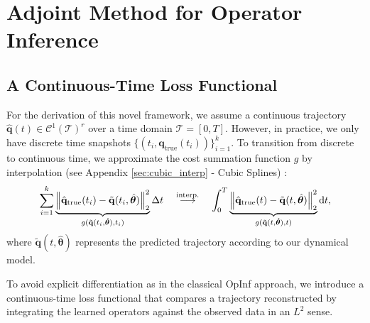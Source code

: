 \chapter{Adjoint Method for Operator Inference}
\label{chap:methodology}



\section{A Continuous-Time Loss Functional}

For the derivation of this novel framework, we assume a continuous trajectory $\hat{\mathbf{q}}(t) \in \mathcal{C}^1(\mathcal{T})^r$ over a time domain $\mathcal{T} = [0,T] $. However, in practice, we only have discrete time snapshots $\displaystyle\{ (t_i, \mathbf{q}_{\text{true}}(t_i)) \}_{i=1}^k$. To transition from discrete to continuous time, we approximate the cost summation function $g$ by interpolation (see Appendix \ref{sec:cubic_interp} - Cubic Splines) \cite{de1978practical}:\\
$$\sum_{i=1}^k \underbrace{\norm{\hat{\mathbf{q}}_\text{true}(t_i)-\tilde{\mathbf{q}}(t_i,\hat{\bm\theta})}_2^2}_{g(\tilde{\mathbf{q}}(t_i,\hat{\bm\theta}),t_i)}\Delta t 
\quad \overset{\text{interp.}}{\longrightarrow} \quad  
\int_0^T \underbrace{\norm{\hat{\mathbf{q}}_\text{true}(t)-\tilde{\mathbf{q}}(t,\hat{\bm\theta})}_2^2}_{g(\tilde{\mathbf{q}}(t,\hat{\bm\theta}),t)} \dd t,
$$
where $\tilde{\mathbf{q}}(t,\hat{\bm\theta})$ represents the predicted trajectory according to our dynamical model.

To avoid explicit differentiation as in the classical OpInf approach, we introduce a continuous-time loss functional that compares a trajectory reconstructed by integrating the learned operators against the observed data in an $L^2$ sense.

